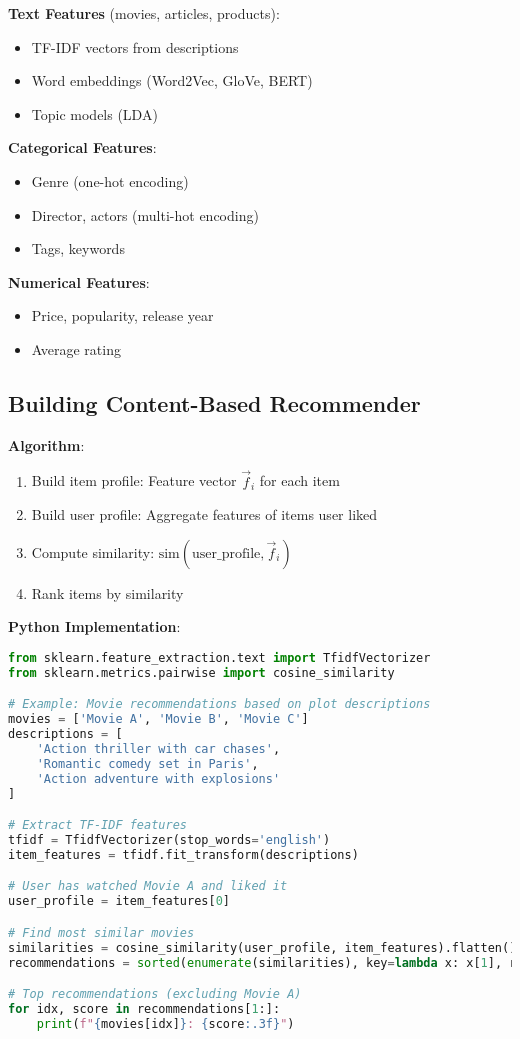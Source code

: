 \documentclass[10pt]{article}
\begin{document}
\textbf{Text Features} (movies, articles, products):
\begin{itemize}[leftmargin=*]
    \item TF-IDF vectors from descriptions
    \item Word embeddings (Word2Vec, GloVe, BERT)
    \item Topic models (LDA)
\end{itemize}

\textbf{Categorical Features}:
\begin{itemize}[leftmargin=*]
    \item Genre (one-hot encoding)
    \item Director, actors (multi-hot encoding)
    \item Tags, keywords
\end{itemize}

\textbf{Numerical Features}:
\begin{itemize}[leftmargin=*]
    \item Price, popularity, release year
    \item Average rating
\end{itemize}

\subsection{Building Content-Based Recommender}

\textbf{Algorithm}:
\begin{enumerate}[leftmargin=*]
    \item Build item profile: Feature vector $\vec{f}_i$ for each item
    \item Build user profile: Aggregate features of items user liked
    \item Compute similarity: $\text{sim}(\text{user\_profile}, \vec{f}_i)$
    \item Rank items by similarity
\end{enumerate}

\textbf{Python Implementation}:
\begin{lstlisting}[language=Python]
from sklearn.feature_extraction.text import TfidfVectorizer
from sklearn.metrics.pairwise import cosine_similarity

# Example: Movie recommendations based on plot descriptions
movies = ['Movie A', 'Movie B', 'Movie C']
descriptions = [
    'Action thriller with car chases',
    'Romantic comedy set in Paris',
    'Action adventure with explosions'
]

# Extract TF-IDF features
tfidf = TfidfVectorizer(stop_words='english')
item_features = tfidf.fit_transform(descriptions)

# User has watched Movie A and liked it
user_profile = item_features[0]

# Find most similar movies
similarities = cosine_similarity(user_profile, item_features).flatten()
recommendations = sorted(enumerate(similarities), key=lambda x: x[1], reverse=True)

# Top recommendations (excluding Movie A)
for idx, score in recommendations[1:]:
    print(f"{movies[idx]}: {score:.3f}")
\end{lstlisting}
\end{document}
